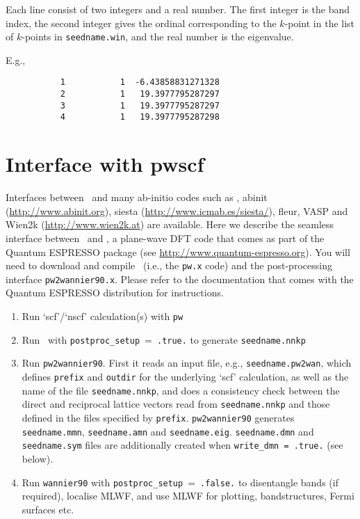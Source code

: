 Each line consist of two integers and a real number. The first integer
is the band index, the second integer gives the ordinal corresponding
to the $k$-point in the list of $k$-points in \verb#seedname.win#,
and the real number is the eigenvalue. 

E.g.,

\begin{verbatim}
           1           1  -6.43858831271328
           2           1   19.3977795287297
           3           1   19.3977795287297
           4           1   19.3977795287298
\end{verbatim}


\section{Interface with {\sc pwscf}}

Interfaces between \wannier\ and many ab-initio codes such as \pwscf, 
{\sc abinit} (\url{http://www.abinit.org}),
{\sc siesta} (\url{http://www.icmab.es/siesta/}), 
{\sc fleur}, {\sc VASP} and {\sc Wien2k} (\url{http://www.wien2k.at}) are
available.  Here we describe the
seamless interface between \wannier\ and \pwscf, a
plane-wave DFT code that comes as part of the {\sc Quantum ESPRESSO}
package (see \url{http://www.quantum-espresso.org}).
You will need
to download and compile \pwscf\ (i.e., the {\tt pw.x} code) and the
post-processing interface {\tt pw2wannier90.x}. Please refer to the
documentation that comes with the {\sc Quantum ESPRESSO} distribution
for instructions. 

\begin{enumerate}
\item Run `scf'/`nscf' calculation(s) with \verb#pw#
\item Run \wannier\ with \verb#postproc_setup#~=~\verb#.true.# to
  generate \verb#seedname.nnkp#
\item Run {\tt pw2wannier90}. First it reads an input file, e.g.,
  \verb#seedname.pw2wan#, which defines \verb#prefix# and
  \verb#outdir# for the underlying `scf' calculation, as well as the
  name of the file \verb#seedname.nnkp#, and does a consistency check
  between the direct and reciprocal lattice vectors read from
  \verb#seedname.nnkp# and those defined in the files specified by
  \verb#prefix#. \verb#pw2wannier90# generates \verb#seedname.mmn#,
  \verb#seedname.amn# and \verb#seedname.eig#. 
    \verb#seedname.dmn# and  \verb#seedname.sym# files are additionally created when  
     \verb#write_dmn = .true.# (see below). 
\item Run \verb#wannier90# with \verb#postproc_setup#~=~\verb#.false.# to
  disentangle bands (if required), localise MLWF, and use MLWF for
  plotting, bandstructures, Fermi surfaces etc.
\end{enumerate}

